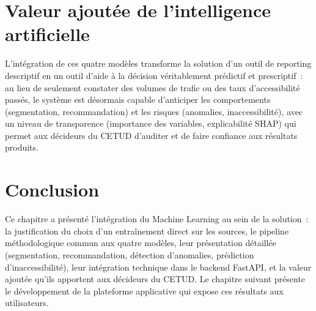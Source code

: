 \section{Valeur ajoutée de l'intelligence artificielle}
L'intégration de ces quatre modèles transforme la solution d'un outil de reporting descriptif en un outil d'aide à la décision véritablement prédictif et prescriptif~: au lieu de seulement constater des volumes de trafic ou des taux d'accessibilité passés, le système est désormais capable d'anticiper les comportements (segmentation, recommandation) et les risques (anomalies, inaccessibilité), avec un niveau de transparence (importance des variables, explicabilité SHAP) qui permet aux décideurs du CETUD d'auditer et de faire confiance aux résultats produits.

\section{Conclusion}
Ce chapitre a présenté l'intégration du Machine Learning au sein de la solution~: la justification du choix d'un entraînement direct sur les sources, le pipeline méthodologique commun aux quatre modèles, leur présentation détaillée (segmentation, recommandation, détection d'anomalies, prédiction d'inaccessibilité), leur intégration technique dans le backend FastAPI, et la valeur ajoutée qu'ils apportent aux décideurs du CETUD. Le chapitre suivant présente le développement de la plateforme applicative qui expose ces résultats aux utilisateurs.

\clearpage

